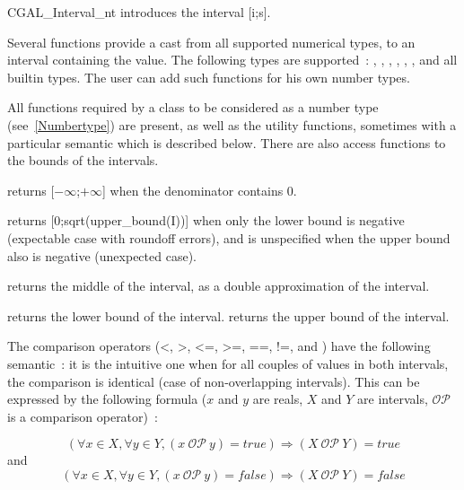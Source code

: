 \begin{ccClass} {CGAL_Interval_nt}
{introduces the interval [i;s].}

Several functions  provide a cast
from all supported numerical types, to an interval 
containing the value.  The following types are supported~: ,
, , , ,
, and all builtin types.
The user can add such functions for his own number types.


\ccOperations
{}

All functions required by a class to be considered as a {\cgal} number type
(see~\ref{Numbertype}) are present, as well as the utility functions,
sometimes with a particular semantic which is described below.  There are also
access functions to the bounds of the intervals.


 {returns
[$-\infty$;$+\infty$] when the denominator contains 0.}

 {returns
[0;sqrt(upper\_bound(I))] when only the lower bound is negative (expectable
case with roundoff errors), and is unspecified when the upper bound also is
negative (unexpected case).}

 {returns the
middle of the interval, as a double approximation of the interval.}

 {returns the lower bound of the interval.}
 {returns the upper bound of the interval.}

The comparison operators (<, >, <=, >=, ==, !=,  and
) have the following semantic~: it is the intuitive
one when for all couples of values in both intervals, the comparison
is identical (case of non-overlapping intervals).  This can be expressed
by the following formula ($x$ and $y$ are reals, $X$ and $Y$ are
intervals, $\mathcal{OP}$ is a comparison operator)~:

$$
\left(\forall x \in X, \forall y \in Y, (x\ \mathcal{OP}\ y) = true\right)
\Rightarrow (X\ \mathcal{OP}\ Y) = true
$$
and
$$
\left(\forall x \in X, \forall y \in Y, (x\ \mathcal{OP}\ y) = false\right)
\Rightarrow (X\ \mathcal{OP}\ Y) =false
$$


\end{ccClass}
